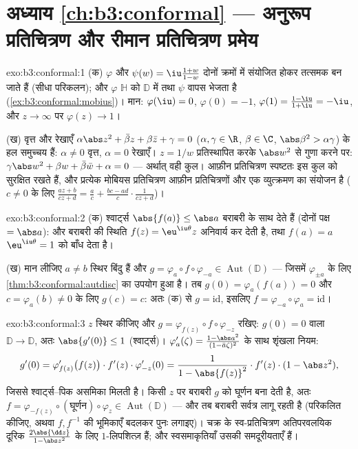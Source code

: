 \section*{अध्याय \ref{ch:b3:conformal} --- अनुरूप प्रतिचित्रण और
रीमान प्रतिचित्रण प्रमेय}

\begin{solution}{exo:b3:conformal:1}
(क) $\varphi$ और $\psi(w) = \iu\frac{1+w}{1-w}$ दोनों क्रमों में संयोजित होकर तत्समक बन जाते हैं
(सीधा परिकलन); और $\varphi$ $\mathbb H$ को $\mathbb D$ में तथा $\psi$ वापस भेजता है (\cref{ex:b3:conformal:mobius})।
मान: $\varphi(\iu) = 0$, $\varphi(0) = -1$, $\varphi(1) = \frac{1 - \iu}{1 + \iu} =
-\iu$, और $z \to \infty$ पर $\varphi(z) \to 1$।

(ख) वृत्त और रेखाएँ
$\alpha\abs z^2 + \bar\beta z + \beta\bar z + \gamma = 0$
($\alpha, \gamma \in \R$, $\beta \in \C$, $\abs\beta^2 >
\alpha\gamma$) के हल समुच्चय हैं: $\alpha \neq 0$ वृत्त, $\alpha = 0$ रेखाएँ। $z = 1/w$
प्रतिस्थापित करके $\abs w^2$ से गुणा करने पर: $\gamma\abs w^2 + \beta w + \bar\beta\bar w + \alpha = 0$ --- अर्थात् वही कुल।
आफ़ीन प्रतिचित्रण स्पष्टतः इस कुल को सुरक्षित रखते हैं, और प्रत्येक
मोबियस प्रतिचित्रण आफ़ीन प्रतिचित्रणों और एक व्युत्क्रमण का संयोजन
है ($c \neq 0$ के लिए $\frac{az+b}{cz+d} = \frac ac + \frac{bc -
ad}{c}\cdot\frac1{cz + d}$)।
\end{solution}

\begin{solution}{exo:b3:conformal:2}
(क) श्वार्ट्स $\abs{f(a)} \leq \abs a$ बराबरी के साथ देते हैं (दोनों पक्ष $= \abs a$): और
बराबरी की स्थिति $f(z) =
\eu^{\iu\theta}z$ अनिवार्य कर देती है, तथा $f(a) = a$ $\eu^{\iu\theta} = 1$ को बाँध
देता है।

(ख) मान लीजिए $a \neq b$ स्थिर बिंदु हैं और $g =
\varphi_a\circ f\circ\varphi_{-a} \in
\operatorname{Aut}(\mathbb D)$ --- जिसमें $\varphi_{\pm a}$ के लिए
\cref{thm:b3:conformal:autdisc} का उपयोग हुआ है। तब $g(0) = \varphi_a(f(a)) = 0$ और $c =
\varphi_a(b) \neq 0$ के लिए $g(c) = c$: अतः (क) से $g = \mathrm{id}$,
इसलिए $f =
\varphi_{-a}\circ\varphi_a = \mathrm{id}$।
\end{solution}

\begin{solution}{exo:b3:conformal:3}
$z$ स्थिर कीजिए और $g = \varphi_{f(z)}\circ f\circ\varphi_{-z}$ रखिए: $g(0) = 0$ वाला  $\mathbb D \to \mathbb D$, अतः $\abs{g'(0)} \leq 1$
(श्वार्ट्स)। $\varphi_a'(\zeta) = \frac{1 - \abs a^2}{(1 - \bar
a\zeta)^2}$ के साथ शृंखला नियम:
\[
g'(0) = \varphi_{f(z)}'\bigl(f(z)\bigr)\cdot f'(z)\cdot
\varphi_{-z}'(0)
= \frac{1}{1 - \abs{f(z)}^2}\cdot f'(z)\cdot(1 - \abs z^2),
\]
जिससे श्वार्ट्स--पिक असमिका मिलती है। किसी $z$ पर बराबरी $g$ को
घूर्णन बना देती है, अतः $f =
\varphi_{-f(z)}\circ(\text{घूर्णन})\circ\varphi_z \in
\operatorname{Aut}(\mathbb D)$ --- और तब बराबरी सर्वत्र लागू रहती है
(परिकलित कीजिए, अथवा $f, f^{-1}$ की भूमिकाएँ बदलकर पुनः लगाइए)। चक्र के
 स्व-प्रतिचित्रण अतिपरवलयिक दूरिक $\frac{2\abs{\dd
z}}{1 - \abs z^2}$ के लिए
$1$-लिपशित्ज़ हैं; और स्वसमाकृतियाँ उसकी समदूरीयताएँ हैं।
\end{solution}

